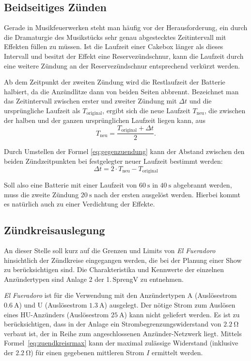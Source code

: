 \documentclass[paper=a4, parskip, numbers=noenddot, toc=listof, headsepline]{scrbook}
\newcommand{\anlage}{\emph{El Fueradoro}}
\begin{document}
			\subsection{Beidseitiges Zünden}
				Gerade in Musikfeuerwerken steht man häufig vor der Herausforderung, ein durch die Dramaturgie des Musikstücks sehr genau abgestecktes Zeitintervall mit Effekten füllen zu müssen. Ist die Laufzeit einer Cakebox länger als dieses Intervall und besitzt der Effekt eine Reservezündschnur, kann die Laufzeit durch eine weitere Zündung an der Reservezündschnur entsprechend verkürzt werden.

				Ab dem Zeitpunkt der zweiten Zündung wird die Restlaufzeit der Batterie halbiert, da die Anzündlitze dann von beiden Seiten abbrennt. Bezeichnet man das Zeitintervall zwischen erster und zweiter Zündung mit ${\Delta}t$ und die ursprüngliche Laufzeit als $T_\text{original}$, ergibt sich die neue Laufzeit $T_\text{neu}$, die zwischen der halben und der ganzen ursprünglichen Laufzeit liegen kann, aus
				\begin{equation}
					T_\text{neu} = \frac{T_\text{original} + {\Delta}t}{2}.
					\label{eq:gegenzuendung}
				\end{equation}

				Durch Umstellen der Formel \eqref{eq:gegenzuendung} kann der Abstand zwischen den beiden Zündzeitpunkten bei festgelegter neuer Laufzeit bestimmt werden:
				\begin{equation}
					{\Delta}t = 2 {\cdot} T_\text{neu} - T_\text{original}
				\end{equation}

				Soll also eine Batterie mit einer Laufzeit von $\SI{60}{\second}$ in $\SI{40}{\second}$ abgebrannt werden, muss die zweite Zündung $\SI{20}{\second}$ nach der ersten ausgelöst werden. Hierbei kommt es natürlich auch zu einer Verdichtung der Effekte.

			\subsection{Zündkreisauslegung}

				An dieser Stelle soll kurz auf die Grenzen und Limits von {\anlage} hinsichtlich der Zündkreise eingegangen werden, die bei der Planung einer Show zu berücksichtigen sind. Die Charakteristika und Kennwerte der einzelnen Anzündertypen sind Anlage 2 der 1.\,SprengV zu entnehmen.

					{\anlage} ist für die Verwendung mit den Anzündertypen A (Auslösestrom $\SI{0,6}{\ampere}$) und U (Auslösestrom $\SI{1,3}{\ampere}$) ausgelegt. Der nötige Strom zum Auslösen eines HU-Anzünders (Auslösestrom $\SI{25}{\ampere}$) kann nicht geliefert werden. Es ist zu berücksichtigen, dass in der Anlage ein Strombegrenzungswiderstand von $\SI{2,2}{\ohm}$ verbaut ist, der in Reihe zum angeschlossenen Anzünder-Netzwerk liegt. Mittels Formel~\eqref{eq:zuendkreisrmax} kann der maximal zulässige Widerstand (inklusive der $\SI{2,2}{\ohm}$) für einen gegebenen mittleren Strom $I$ ermittelt werden.
\end{document}
